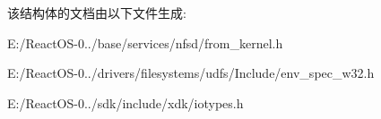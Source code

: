 该结构体的文档由以下文件生成\+:\begin{DoxyCompactItemize}
\item 
E\+:/\+React\+O\+S-\/0../base/services/nfsd/from\+\_\+kernel.\+h\item 
E\+:/\+React\+O\+S-\/0../drivers/filesystems/udfs/\+Include/env\+\_\+spec\+\_\+w32.\+h\item 
E\+:/\+React\+O\+S-\/0../sdk/include/xdk/iotypes.\+h\end{DoxyCompactItemize}
